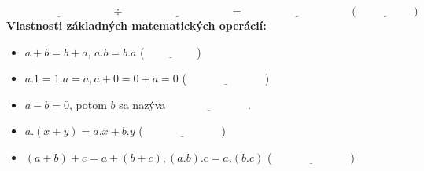\documentclass[12pt]{article}
\begin{document}
	$\underline{\hspace{4cm}} \div \underline{\hspace{4cm}}
	= \underline{\hspace{4cm}} (\underline{\hspace{2cm}})$\\
	\newline
	\textbf{Vlastnosti základných matematických operácií:}\\
	\begin{itemize}
		\item $a+b = b+a$, $a.b = b.a$ ($\underline{\hspace{2cm}}$)
		\item $a.1 = 1.a = a, a+0 = 0+a = 0$ ($\underline{\hspace{3cm}}$)
		\item $a-b = 0$, potom $b$ sa nazýva $\underline{\hspace{3cm}}$.
		\item $a.(x+y) = a.x + b.y$ ($\underline{\hspace{3cm}}$)
		\item $(a+b)+c = a+(b+c), (a.b).c = a.(b.c)$ ($\underline{\hspace{3cm}}$)
	\end{itemize}
	
\end{document}
